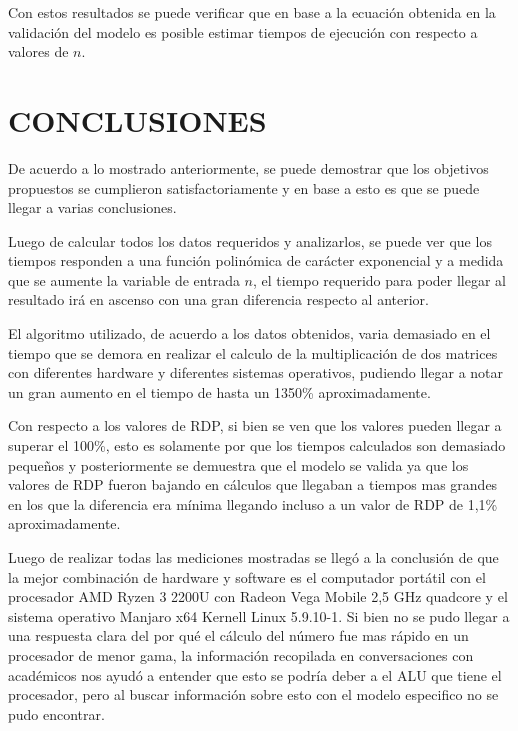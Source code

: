 \documentclass[11pt, twocolumn]{llncs}
\begin{document}
Con estos resultados se puede  verificar que en base a la ecuación obtenida en la validación del modelo es posible estimar tiempos de ejecución con respecto a valores de $n$.
\section{CONCLUSIONES}\label{conclusiones}

De acuerdo a lo mostrado anteriormente, se puede demostrar que los objetivos propuestos se cumplieron satisfactoriamente y en base a esto es que se puede llegar a varias conclusiones.

Luego de calcular todos los datos requeridos y analizarlos, se puede ver que los tiempos responden a una función polinómica de carácter exponencial y a medida que se aumente la variable de entrada $n$, el tiempo requerido para poder llegar al resultado irá en ascenso con una gran diferencia respecto al anterior.

El algoritmo utilizado, de acuerdo a los datos obtenidos, varia demasiado en el tiempo que se demora en realizar el calculo de la multiplicación de dos matrices con diferentes hardware y diferentes sistemas operativos, pudiendo llegar a notar un gran aumento en el tiempo de hasta un 1350\% aproximadamente.

Con respecto a los valores de RDP, si bien se ven que los valores pueden llegar a superar el 100\%, esto es solamente por que los tiempos calculados son demasiado pequeños y posteriormente se demuestra que el modelo se valida ya que los valores de RDP fueron bajando en cálculos que llegaban a tiempos mas grandes en los que la diferencia era mínima llegando incluso a un valor de RDP de 1,1\% aproximadamente.

Luego de realizar todas las mediciones mostradas se llegó a la conclusión de que la mejor combinación de hardware y software es el computador portátil con el procesador AMD Ryzen 3 2200U con Radeon Vega Mobile 2,5 GHz quadcore y el sistema operativo Manjaro x64 Kernell Linux 5.9.10-1. Si bien no se pudo llegar a una respuesta clara del por qué el cálculo del número fue mas rápido en un procesador de menor gama, la información recopilada en conversaciones con académicos nos ayudó a entender que esto se podría deber a el ALU que tiene el procesador, pero al buscar información sobre esto con el modelo especifico no se pudo encontrar.

\end{document}
